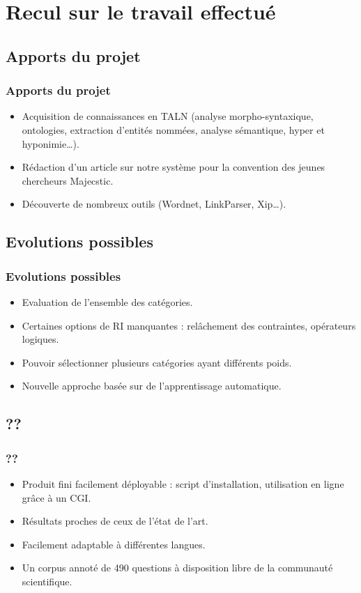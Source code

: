 \documentclass[xcolor=dvipsnames]{beamer}
\begin{document}
\section{Recul sur le travail effectué}
\subsection{Apports du projet}
\frame
{
    \frametitle{Apports du projet}
    \begin{itemize}
      \item<1-> Acquisition de connaissances en TALN (analyse morpho-syntaxique, ontologies, extraction d'entités nommées, analyse sémantique, hyper et hyponimie\ldots).
      \item<2-> Rédaction d'un article sur notre système pour la convention des jeunes chercheurs Majecstic.
      \item<3-> Découverte de nombreux outils (Wordnet, LinkParser, Xip\ldots).
    \end{itemize}
}
\subsection{Evolutions possibles}
\frame
{
    \frametitle{Evolutions possibles}
    \begin{itemize}
      \item<1-> Evaluation de l'ensemble des catégories.
      \item<2-> Certaines options de RI manquantes : relâchement des contraintes, opérateurs logiques.
      \item<3-> Pouvoir sélectionner plusieurs catégories ayant différents poids.
      \item<4-> Nouvelle approche basée sur de l'apprentissage automatique.
    \end{itemize}
}
\subsection{??}
\frame
{
    \frametitle{??}
    \begin{itemize}
        \item<1-> Produit fini facilement déployable : script d'installation, utilisation en ligne grâce à un CGI.
        \item<2-> Résultats proches de ceux de l'état de l'art.
        \item<3-> Facilement adaptable à différentes langues.
        \item<4-> Un corpus annoté de 490 questions à disposition libre de la communauté scientifique.
    \end{itemize}
}
\end{document}
